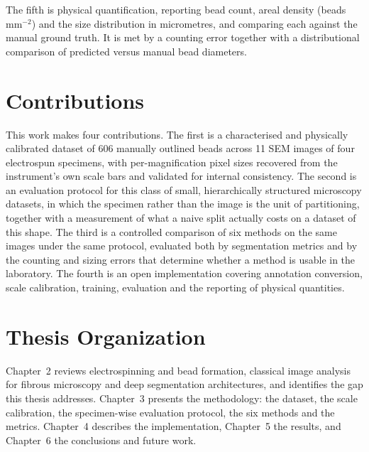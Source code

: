 The fifth is physical quantification, reporting bead count, areal density
(beads\,mm$^{-2}$) and the size distribution in micrometres, and comparing each
against the manual ground truth. It is met by a counting error together with a
distributional comparison of predicted versus manual bead diameters.

\section{Contributions}

This work makes four contributions. The first is a characterised and physically
calibrated dataset of 606 manually outlined beads across 11 SEM images of four
electrospun specimens, with per-magnification pixel sizes recovered from the
instrument's own scale bars and validated for internal consistency. The second is
an evaluation protocol for this class of small, hierarchically structured
microscopy datasets, in which the specimen rather than the image is the unit of
partitioning, together with a measurement of what a naive split actually costs on
a dataset of this shape. The third is a controlled comparison of six methods on
the same images under the same protocol, evaluated both by segmentation metrics
and by the counting and sizing errors that determine whether a method is usable in
the laboratory. The fourth is an open implementation covering annotation
conversion, scale calibration, training, evaluation and the reporting of physical
quantities.

\section{Thesis Organization}

Chapter~2 reviews electrospinning and bead formation, classical image
analysis for fibrous microscopy and deep segmentation architectures, and
identifies the gap this thesis addresses. Chapter~3 presents the
methodology: the dataset, the scale calibration, the specimen-wise evaluation
protocol, the six methods and the metrics. Chapter~4 describes the
implementation, Chapter~5 the results, and Chapter~6 the
conclusions and future work.
